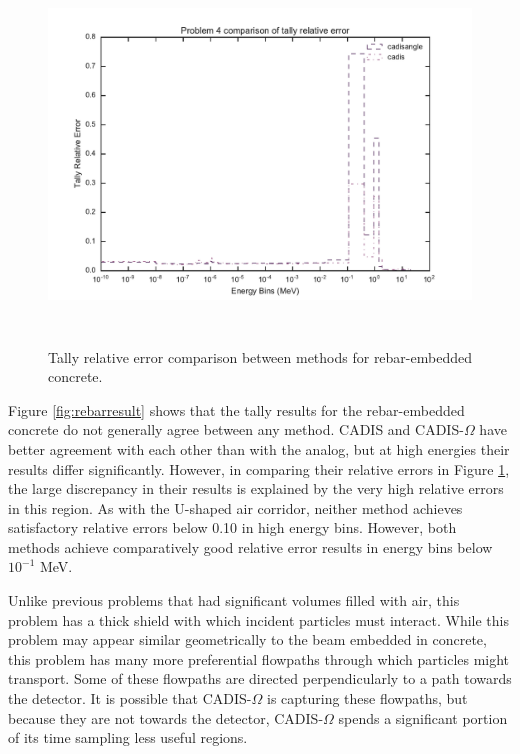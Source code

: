 \begin{figure}[h!]
  \centering
  \includegraphics[height=10cm]{./chapters/characterization_probs/figures/char/prob_4/problem_4_tally_error_compare.pdf}
  \caption[Tally relative error comparison between methods for rebar-embedded concrete.]
  {Tally relative error comparison between methods for rebar-embedded concrete.}
  \label{fig:rebarerror}
\end{figure}

Figure \ref{fig:rebarresult} shows that the tally results for the rebar-embedded
concrete do not generally agree between any method. CADIS and CADIS-$\Omega$
have better agreement with each other than with the analog, but at
high energies their results differ significantly. However, in comparing their
relative errors in Figure \ref{fig:rebarerror}, the large discrepancy in their
results is explained by the very high relative errors in this region. As with
the U-shaped air corridor, neither method achieves satisfactory relative errors
below 0.10 in high energy bins. However, both methods achieve comparatively good
relative error results in energy bins below $10^{-1}$ MeV.

Unlike previous problems that had
significant volumes filled with air, this problem has a thick
shield with which incident particles must interact. While this problem may
appear similar geometrically to the beam embedded in
concrete, this problem has many more preferential flowpaths through which particles
might transport. Some of these flowpaths are directed perpendicularly to a path
towards the detector. It is possible that CADIS-$\Omega$ is capturing these
flowpaths, but because they are not towards the detector, CADIS-$\Omega$ spends a
significant portion of its time sampling less useful regions.

